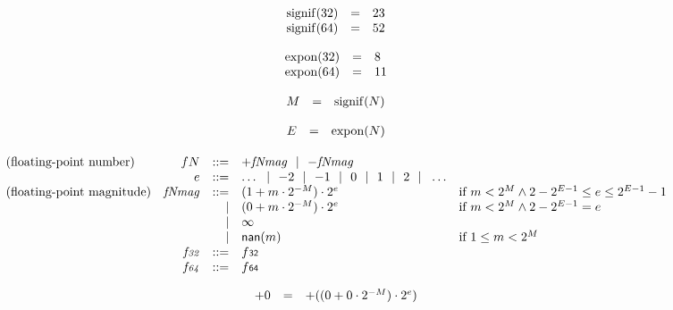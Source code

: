 \vspace{1ex}

$$
\begin{array}[t]{@{}lcl@{}l@{}}
{\mathrm{signif}}(32) & = & 23 \\
{\mathrm{signif}}(64) & = & 52 \\
\end{array}
$$

$$
\begin{array}[t]{@{}lcl@{}l@{}}
{\mathrm{expon}}(32) & = & 8 \\
{\mathrm{expon}}(64) & = & 11 \\
\end{array}
$$

$$
\begin{array}[t]{@{}lcl@{}l@{}}
M & = & {\mathrm{signif}}(N) \\
\end{array}
$$

$$
\begin{array}[t]{@{}lcl@{}l@{}}
E & = & {\mathrm{expon}}(N) \\
\end{array}
$$

$$
\begin{array}[t]{@{}lrrl@{}l@{}}
\mbox{(floating-point number)} & {f}{N} & ::= & {+{{\mathit{fNmag}}}} ~~|~~ {-{{\mathit{fNmag}}}} \\
& e & ::= & \dots ~~|~~ {-2} ~~|~~ {-1} ~~|~~ 0 ~~|~~ 1 ~~|~~ 2 ~~|~~ \dots \\
\mbox{(floating-point magnitude)} & {{\mathit{fNmag}}} & ::= & (1 + m \cdot {2^{{-M}}}) \cdot {2^{e}} & \quad \mbox{if}~ m < {2^{M}} \land 2 - {2^{E - 1}} \leq e \leq {2^{E - 1}} - 1 \\
& & | & (0 + m \cdot {2^{{-M}}}) \cdot {2^{e}} & \quad \mbox{if}~ m < {2^{M}} \land 2 - {2^{E - 1}} = e \\
& & | & \infty \\
& & | & {\mathsf{nan}}{(m)} & \quad \mbox{if}~ 1 \leq m < {2^{M}} \\
& {\mathit{f{\kern-0.1em\scriptstyle 32}}} & ::= & {f}{\mathsf{{\scriptstyle 32}}} \\
& {\mathit{f{\kern-0.1em\scriptstyle 64}}} & ::= & {f}{\mathsf{{\scriptstyle 64}}} \\
\end{array}
$$

$$
\begin{array}[t]{@{}lcl@{}l@{}}
{+0} & = & {+((0 + 0 \cdot {2^{{-M}}}) \cdot {2^{e}})} \\
\end{array}
$$

